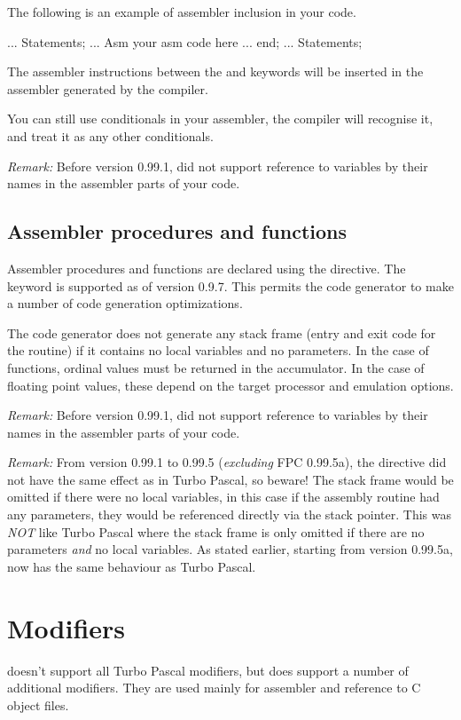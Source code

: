 \documentclass{report}
\begin{document}
The following is an example of assembler inclusion in your code.
\begin{listing}
 ...
 Statements;
 ...
 Asm
   your asm code here
   ...
 end;
 ...
 Statements;
\end{listing}

The assembler instructions between the  and  keywords will
be inserted in the assembler generated by the compiler.

You can still use conditionals in your assembler, the compiler will
recognise it, and treat it as any other conditionals.

\emph{ Remark: } Before version 0.99.1, \fpc did not support
reference to variables by their names in the assembler parts of your code.

\subsection{ Assembler procedures and functions }

Assembler procedures and functions are declared using the
 directive. The  keyword is supported
as of version 0.9.7. This permits the code generator to make a number
of code generation optimizations.

The code generator does not generate any stack frame (entry and exit
code for the routine) if it contains no local variables and no
parameters. In the case of functions, ordinal values must be returned
in the accumulator. In the case of floating point values, these depend
on the target processor and emulation options.

\emph{ Remark: } Before version 0.99.1, \fpc did not support
reference to variables by their names in the assembler parts of your code.

\emph{ Remark: } From version 0.99.1 to 0.99.5 (\emph{excluding}
FPC 0.99.5a), the  directive did not have the
same effect as in Turbo Pascal, so beware! The stack frame would be
omitted if there were no local variables, in this case if the assembly
routine had any parameters, they would be referenced directly via the stack
pointer. This was \emph{ NOT} like Turbo Pascal where the stack frame is only
omitted if there are no parameters \emph{ and } no local variables. As
stated earlier, starting from version 0.99.5a, \fpc now has the same
behaviour as Turbo Pascal.

\section{Modifiers}
\fpc doesn't support all Turbo Pascal modifiers, but
does support a number of additional modifiers. They are used mainly for assembler and
reference to C object files.
\end{document}
